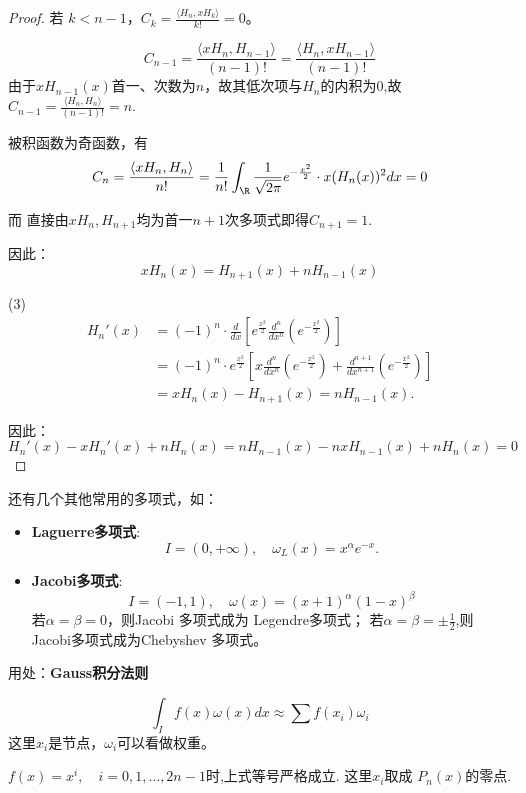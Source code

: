 \begin{proof}
若 $k < n-1$，$C_k = \frac{\langle H_n, xH_k\rangle}{k!} = 0$。

\[
C_{n-1} = \frac{\langle xH_n, H_{n-1}\rangle}{(n-1)!} = \frac{\langle H_n, xH_{n-1}\rangle}{(n-1)!} 
\]
由于$xH_{n-1}(x)$首一、次数为$n$，故其低次项与$H_n$的内积为$0$,故$C_{n-1}= \frac{\langle H_n, H_{n}\rangle}{(n-1)!}=n$.

被积函数为奇函数，有
\[
C_n = \frac{\langle xH_n, H_n\rangle}{n!} = \frac{1}{n!} \int_{\R} \frac{1}{\sqrt{2\pi}} e^{-\frac{x^2}{2}} \cdot x (H_n(x))^2 dx = 0
\]


而 直接由$xH_n,H_{n+1}$均为首一$n+1$次多项式即得$C_{n+1} = 1$.

因此：
\[
xH_n(x) = H_{n+1}(x) + nH_{n-1}(x)
\]

(3) 
\begin{equation*}
    \begin{aligned}
        H_n'(x) &= (-1)^n \cdot \frac{d}{dx} \left[ e^{\frac{x^2}{2}} \frac{d^n}{dx^n} (e^{-\frac{x^2}{2}}) \right]\\
        &= (-1)^n \cdot e^{\frac{x^2}{2}} \left[ x \frac{d^n}{dx^n} (e^{-\frac{x^2}{2}}) + \frac{d^{n+1}}{dx^{n+1}} (e^{-\frac{x^2}{2}}) \right]\\
        &= x H_n(x) - H_{n+1}(x) = n H_{n-1}(x).
    \end{aligned}
\end{equation*}

因此：
\[
H_n'(x) - x H_n'(x) + n H_n(x) = n H_{n-1}(x) - n x H_{n-1}(x) + n H_n(x) = 0
\]
\end{proof}
还有几个其他常用的多项式，如：

\begin{itemize}
    \item \textbf{Laguerre多项式}: \\
    \[I=(0,+\infty),\quad \omega_L(x)=x^\alpha e^{-x}.\]

    \item \textbf{Jacobi多项式}: \\
   \[I=(-1,1),\quad \omega(x)=(x+1)^\alpha(1-x)^\beta\]
   若$\alpha=\beta=0$，则Jacobi 多项式成为 Legendre多项式；
   若$\alpha=\beta=\pm\frac12$,则Jacobi多项式成为Chebyshev 多项式。
\end{itemize}

用处：\textbf{Gauss积分法则}

$$\int_I f(x) \omega(x) dx \approx \sum f(x_i) \omega_i $$
这里$x_i$是节点，$\omega_i$可以看做权重。

$f(x)=x^{i}, \quad i=0,1,\dots,2n-1$时,上式等号严格成立.
这里$x_{i}$取成 $P_n(x)$的零点.

